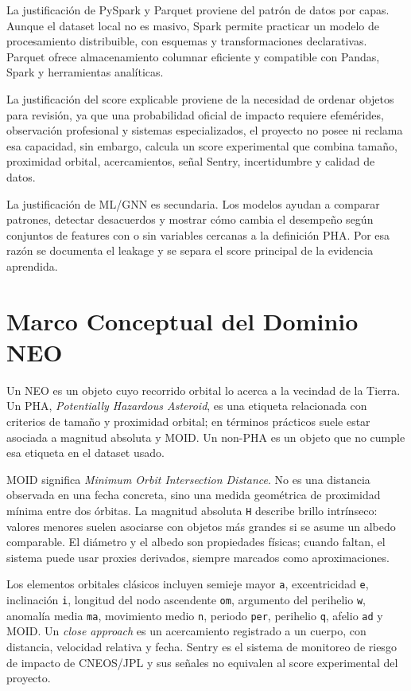 \documentclass[12pt,a4paper]{report}
\newcommand{\code}[1]{\texttt{#1}}
\begin{document}
La justificación de PySpark y Parquet proviene del patrón de datos por capas. Aunque el dataset local no es masivo, Spark permite practicar un modelo de procesamiento distribuible, con esquemas y transformaciones declarativas. Parquet ofrece almacenamiento columnar eficiente y compatible con Pandas, Spark y herramientas analíticas.

La justificación del score explicable proviene de la necesidad de ordenar objetos para revisión, ya que una probabilidad oficial de impacto requiere efemérides, observación profesional y sistemas especializados, el proyecto no posee ni reclama esa capacidad, sin embargo, calcula un score experimental que combina tamaño, proximidad orbital, acercamientos, señal Sentry, incertidumbre y calidad de datos.

La justificación de ML/GNN es secundaria. Los modelos ayudan a comparar patrones, detectar desacuerdos y mostrar cómo cambia el desempeño según conjuntos de features con o sin variables cercanas a la definición PHA. Por esa razón se documenta el leakage y se separa el score principal de la evidencia aprendida.

\chapter{Marco Conceptual del Dominio NEO}

Un NEO es un objeto cuyo recorrido orbital lo acerca a la vecindad de la Tierra. Un PHA, \emph{Potentially Hazardous Asteroid}, es una etiqueta relacionada con criterios de tamaño y proximidad orbital; en términos prácticos suele estar asociada a magnitud absoluta y MOID. Un non-PHA es un objeto que no cumple esa etiqueta en el dataset usado.

MOID significa \emph{Minimum Orbit Intersection Distance}. No es una distancia observada en una fecha concreta, sino una medida geométrica de proximidad mínima entre dos órbitas. La magnitud absoluta \code{H} describe brillo intrínseco: valores menores suelen asociarse con objetos más grandes si se asume un albedo comparable. El diámetro y el albedo son propiedades físicas; cuando faltan, el sistema puede usar proxies derivados, siempre marcados como aproximaciones.

Los elementos orbitales clásicos incluyen semieje mayor \code{a}, excentricidad \code{e}, inclinación \code{i}, longitud del nodo ascendente \code{om}, argumento del perihelio \code{w}, anomalía media \code{ma}, movimiento medio \code{n}, periodo \code{per}, perihelio \code{q}, afelio \code{ad} y MOID. Un \emph{close approach} es un acercamiento registrado a un cuerpo, con distancia, velocidad relativa y fecha. Sentry es el sistema de monitoreo de riesgo de impacto de CNEOS/JPL y sus señales no equivalen al score experimental del proyecto.
\end{document}
